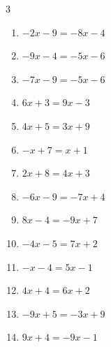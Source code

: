 \begin{multicols}{3}
\begin{enumerate}

  \item $-2x-9=-8x-4$


  \item $-9x-4=-5x-6$


  \item $-7x-9=-5x-6$


  \item $6x+3=9x-3$

        \phantom{$\displaystyle x=2$}

  \item $4x+5=3x+9$

        \phantom{$\displaystyle x=4$}

  \item $-x+7=x+1$

        \phantom{$\displaystyle x=3$}

  \item $2x+8=4x+3$


  \item $-6x-9=-7x+4$

        \phantom{$\displaystyle x=13$}

  \item $8x-4=-9x+7$


  \item $-4x-5=7x+2$


\columnbreak %

  \item $-x-4=5x-1$


  \item $4x+4=6x+2$

        \phantom{$\displaystyle x=1$}

  \item $-9x+5=-3x+9$


  \item $9x+4=-9x-1$


\end{enumerate}
\end{multicols}
